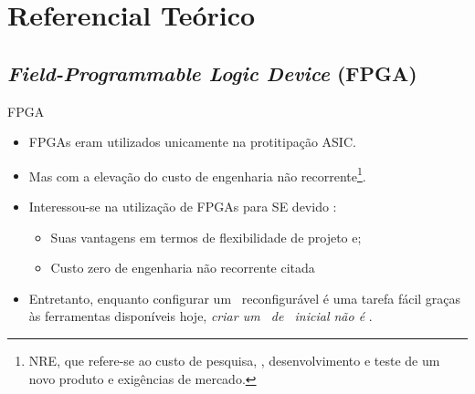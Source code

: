 \section{Referencial Teórico}
   \subsection{{\it Field-Programmable Logic Device} (FPGA)}
      \begin{frame}{FPGA} \vspace{-1em}
         \begin{itemize}
            \setlength{\itemsep}{1.2em}
            \item FPGAs eram utilizados unicamente na protitipação ASIC.
            
            \item Mas com a elevação do custo de engenharia não recorrente\footnote{NRE, que refere-se ao custo de pesquisa, \design, desenvolvimento e teste de um novo produto e exigências de mercado.}.
            
            \item Interessou-se na utilização de FPGAs para SE devido \cite{Mei2000}:
            \begin{itemize}
               \item Suas vantagens em termos de flexibilidade de projeto e;
               \item Custo zero de engenharia não recorrente citada
            \end{itemize}
         
            \item Entretanto, enquanto configurar um \hardware\ reconfigurável é uma tarefa fácil graças às ferramentas disponíveis hoje, \emph{criar um \design\ de \hardware\ inicial não é} \cite{Sass2010}.
            
         \end{itemize}
      \end{frame}
   
